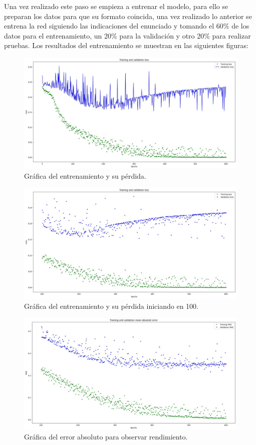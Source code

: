 Una vez realizado este paso se empieza a entrenar el modelo, para ello se preparan los datos para que su formato coincida, una vez realizado lo anterior se entrena la red siguiendo las indicaciones del enunciado y tomando el 60\% de los datos para el entrenamiento, un 20\% para la validación y otro 20\% para realizar pruebas. Los resultados del entrenamiento se muestran en las siguientes figuras:
\begin{figure}[H]
    \centering
    \includegraphics[width=.65\linewidth]{Imagenes/k (3).jpg}
    \caption{Gráfica del entrenamiento y su pérdida.}
\end{figure}

\begin{figure}[H]
    \centering
    \includegraphics[width=.65\linewidth]{Imagenes/k (4).jpg}
    \caption{Gráfica del entrenamiento y su pérdida iniciando en 100.}
\end{figure}

\begin{figure}[H]
    \centering
    \includegraphics[width=.65\linewidth]{Imagenes/k (5).jpg}
    \caption{Gráfica del error absoluto para observar rendimiento.}
\end{figure}

